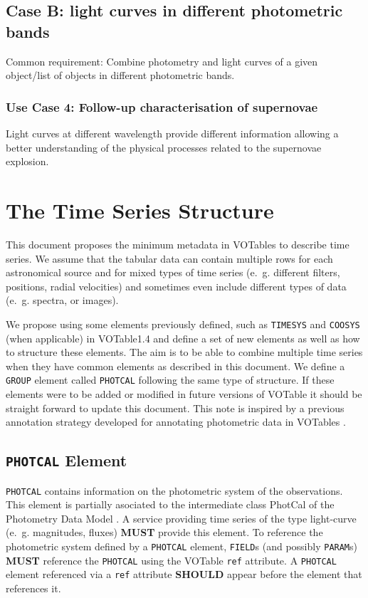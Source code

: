 \documentclass[11pt,a4paper]{ivoa}
\let\fg=\color
\def\attr#1{{\tt{\fg{DarkRed}#1}}}
\def\elem#1{{\tt{\fg{DarkRed}#1}}}
\begin{document}
\subsection{Case B: light curves in different photometric bands}
Common requirement: Combine photometry and light curves of a given object/list of objects in different photometric bands.

\subsubsection{Use Case 4: Follow-up characterisation of supernovae}
Light curves at different wavelength provide different information allowing a better understanding of the physical processes related to the supernovae explosion.

\section{The Time Series Structure}
\label{elem:TIMESERIES}
This document proposes the minimum metadata in VOTables to describe time series. We assume that the tabular data can contain multiple rows for each astronomical source and for mixed types of time series (e.~g. different filters, positions, radial velocities) and sometimes even include different types of data (e.~g. spectra, or images). 

We propose using some elements previously defined, such as \elem{TIMESYS} and \elem{COOSYS} (when applicable) in VOTable1.4 \citet{std:VOTABLE1.4} and define a set of new elements as well as how to structure these elements. The aim is to be able to combine multiple time series when they have common elements as described in this document. We define a \elem{GROUP} element called \elem{PHOTCAL} following the same type of structure. If these elements were to be added or modified in future versions of VOTable it should be straight forward to update this document. This note is inspired by a previous annotation strategy developed for annotating photometric data in VOTables \citep{note:seb2010-1}.

%
%

\subsection{\elem{PHOTCAL} Element}
\elem{PHOTCAL} contains information on the photometric system of the observations. This element is partially asociated to the intermediate class PhotCal of the Photometry Data Model \citep{std:PDM}. A service providing time series of the type light-curve (e.~g. magnitudes, fluxes) \textbf{MUST} provide this element. To reference the photometric system defined by a \elem{PHOTCAL} element, \elem{FIELD}s (and possibly \elem{PARAM}s) \textbf{MUST} reference the \elem{PHOTCAL} using the VOTable \attr{ref} attribute. A \elem{PHOTCAL} element referenced via a \attr{ref} attribute \textbf{SHOULD} appear before the element that references it. 
\end{document}
